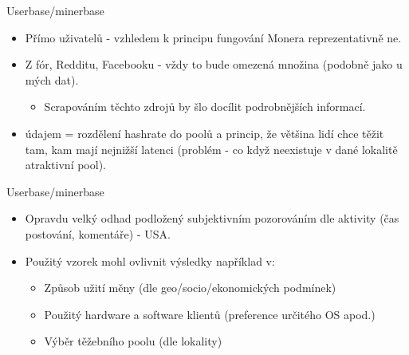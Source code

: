 \documentclass{beamer}
\begin{document}
\begin{darkframes}
        \begin{frame}{Userbase/minerbase}
\begin{itemize}
\item Přímo uživatelů - vzhledem k principu fungování Monera reprezentativně ne.
\item Z fór, Redditu, Facebooku - vždy to bude omezená množina (podobně jako u mých dat).
\begin{itemize}
\item Scrapováním těchto zdrojů by šlo docílit podrobnějších informací.
\end{itemize}
\item {} údajem = rozdělení hashrate do poolů a princip, že většina lidí chce těžit tam, kam mají nejnižší latenci (problém - co když neexistuje v dané lokalitě atraktivní pool).
\end{itemize}
    \end{frame}
    
            \begin{frame}{Userbase/minerbase}
\begin{itemize}
\item Opravdu velký odhad podložený subjektivním pozorováním dle aktivity (čas postování, komentáře) - USA.
\item Použitý vzorek mohl ovlivnit výsledky například v:
\begin{itemize}
\item Způsob užití měny (dle geo/socio/ekonomických podmínek)
\item Použitý hardware a software klientů (preference určitého OS apod.)
\item Výběr těžebního poolu (dle lokality)
\end{itemize}
\end{itemize}
    \end{frame}
    


\end{darkframes}
\end{document}
